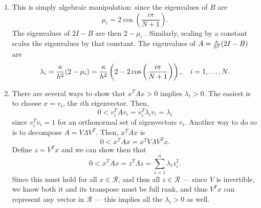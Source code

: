 {\begin{solution}
\begin{enumerate}
\begin{align*}
& -x_ix_{i-1} + 2x_i^2 - x_ix_{i+1}\\
& + \ldots + \\
& -x_{N-1}x_N  + 2x_N^2.
\end{align*}
Notice that $(x_i-x_{i-1})^2 = x_{i-1}^2 - 2x_ix_{i-1} + x_i^2$.
Rearranging terms in the above expression gives 
\begin{align*}
x^T Tx = & x_1^2 \\
&+ x_1^2 - 2x_2x_1 + x_2^2\\
& + \ldots + \\
& x_{i-1}^2 - 2x_ix_{i-1} + x_i^2\\
& + \ldots + \\
& x_{N-1}^2 - 2x_Nx_{N-1} + x_N^2\\
& x_N^2.
\end{align*}
which reduces down to 
\begin{align*}
x^T Tx = & x_1^2 \\
& + (x_1-x_2)^2\\
& + \ldots + \\
& + (x_{i-1}-x_i)^2\\
& + \ldots + \\
& + (x_{N-1}-x_N)^2\\
& x_N^2.
\end{align*}
Since all these terms are positive, the matrix $T$ is positive definite, and thus $A$ is also positive definite. 
\item This is simply algebraic manipulation: since the eigenvalues of $B$ are 
\[
\mu_i = 2\cos\left(\frac{i \pi}{N+1}\right).
\]
The eigenvalues of $2I - B$ are then $2-\mu_i$ .  Similarly, scaling by a constant scales the eigenvalues by that constant.  The eigenvalues of $A = {\kappa\over h^2}(2I-B)$ are
\[
\lambda_i = {\kappa \over h^2}(2-\mu_i) = {\kappa\over h^2}\left(2-2\cos\left(\frac{i \pi}{N+1}\right)\right), \quad i = 1,\ldots, N.
\]
\item There are several ways to show that $x^TAx > 0$ implies $\lambda_i > 0$.  The easiest is to choose $x = v_i$, the $i$th eigenvector.  Then, 
\[
0 < v_i^T Av_i = v_i^T\lambda_i v_i = \lambda_i
\]
since $v_i^Tv_i = 1$ for an orthonormal set of eigenvectors $v_i$. Another way to do so is to decompose $A = V\Lambda V^T$.  Then, $x^TAx$ is
\[
0< x^TAx = x^TV\Lambda V^Tx.
\]
Define $z = V^Tx$ and we can show then that
\[
0< x^TAx = z^T\Lambda z = \sum_{i=1}^n \lambda_i z_i^2.
\]
Since this must hold for all $x \in \mathcal{R}$, and thus all $z \in \mathcal{R}$ --- since $V$ is invertible, we know both it and its transpose must be full rank, and thus $V^Tx$ can represent any vector in $\mathcal{R}$ --- this implies all the $\lambda_i >0$ as well.  

\end{enumerate}
\end{solution}
}{}
